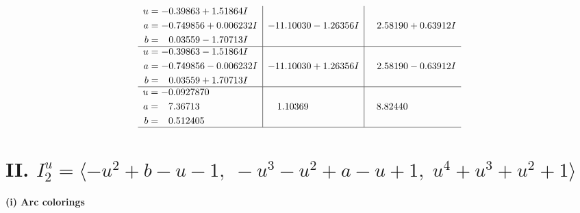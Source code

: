 \documentclass[1p]{elsarticle_modified}
\theoremstyle{definition}
\begin{document}
$$\begin{array}{c|c|c}
\begin{aligned}
u &= -0.39863 + 1.51864 I \\
a &= -0.749856 + 0.006232 I \\
b &= \phantom{-}0.03559 - 1.70713 I\end{aligned}
 & -11.10030 - 1.26356 I & \phantom{-}2.58190 + 0.63912 I \\ \hline\begin{aligned}
u &= -0.39863 - 1.51864 I \\
a &= -0.749856 - 0.006232 I \\
b &= \phantom{-}0.03559 + 1.70713 I\end{aligned}
 & -11.10030 + 1.26356 I & \phantom{-}2.58190 - 0.63912 I \\ \hline\begin{aligned}
u &= -0.0927870\phantom{ +0.000000I} \\
a &= \phantom{-}7.36713\phantom{ +0.000000I} \\
b &= \phantom{-}0.512405\phantom{ +0.000000I}\end{aligned}
 & \phantom{-}1.10369\phantom{ +0.000000I} & \phantom{-}8.82440\phantom{ +0.000000I}\\
 \hline 
 \end{array}$$\newpage\newpage\renewcommand{\arraystretch}{1}
\centering \section*{II. $I^u_{2}= \langle - u^2+b- u-1,\;- u^3- u^2+a- u+1,\;u^4+u^3+u^2+1 \rangle$}
\flushleft \textbf{(i) Arc colorings}\\
\end{document}
